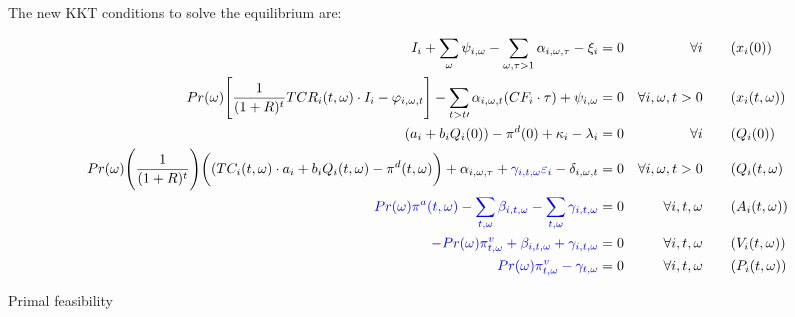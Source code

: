 \documentclass[11pt, letterpaper]{article}
\newcommand{\pia}{\textcolor[rgb]{0,0,1}}
\begin{document}
The new KKT conditions to solve the equilibrium are:

\begin{align}
    I_i + \sum_{\omega}\psi_{i,\omega} -\sum_{\omega,\tau>1} \alpha_{i,\omega,\tau} -\xi_i & = 0 & \forall i {\color{blue}}&  \qquad (x_i(0))\\
    Pr(\omega) \Bigg[\frac{1}{(1+R)^t}TCR_i(t,\omega) \cdot I_i -  \varphi_{i,\omega,t}\Bigg] - \sum_{t> t\prime}\alpha_{i,\omega,t} ( CF_i \cdot \tau)  + \psi_{i,\omega}& = 0 & \forall i, \omega, t> 0  &  \qquad (x_i(t,\omega))\\
    (a_{i}+b_i Q_i(0))-\pi^d(0) + \kappa_i - \lambda_{i}  & = 0 & \forall i  &  \qquad (Q_i(0))\\
 Pr(\omega) \Bigg( \frac{1}{(1+R)^t}\Bigg) \bigg( (TC_i(t,\omega) \cdot a_{i}+b_i Q_i(t,\omega)-\pi^d(t,\omega) \bigg) + \alpha_{i,\omega,\tau} + \pia{\gamma_{i,t,\omega} \varepsilon_{i}} -\delta_{i,\omega,t} & =0 & \forall i, \omega, t>0 &  \qquad (Q_i(t,\omega)\\
  \pia{  Pr(\omega)\pi^a(t,\omega) - \sum_{t,\omega}\beta_{i,t,\omega} - \sum_{t,\omega}\gamma_{i,t,\omega} } & =0 & \forall i,t,\omega & \qquad (A_{i}(t,\omega)) \\
  \pia{  -Pr(\omega) \pi^v_{t,\omega} + \beta_{i,t,\omega}  + \gamma_{i,t,\omega}} & =0 & \forall i,t,\omega & \qquad (V_i(t,\omega)) \\
\pia{    Pr(\omega) \pi^v_{t,\omega} -\gamma_{t,\omega}} & = 0 & \forall i, t,\omega & \qquad (P_i(t,\omega))
\end{align}

\begin{flushleft}
Primal feasibility
\end{flushleft}
\end{document}
